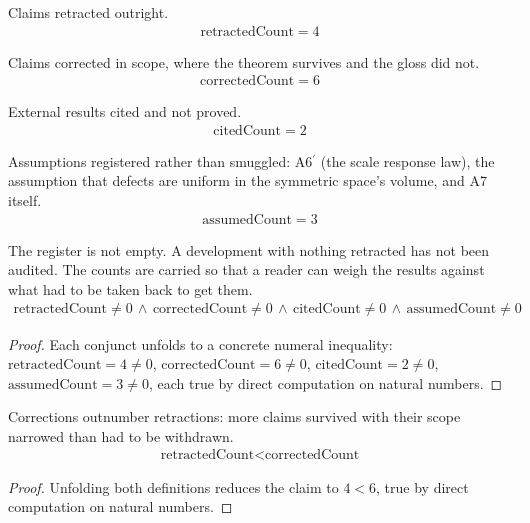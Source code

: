 \begin{definition}
Claims retracted outright.
\begin{align*}
\text{retractedCount} = 4
\end{align*}
\end{definition}

\begin{definition}
Claims corrected in scope, where the theorem survives and the gloss did not.
\begin{align*}
\text{correctedCount} = 6
\end{align*}
\end{definition}

\begin{definition}
External results cited and not proved.
\begin{align*}
\text{citedCount} = 2
\end{align*}
\end{definition}

\begin{definition}
Assumptions registered rather than smuggled: A6$^\prime$ (the scale response law), the assumption that defects are uniform in the symmetric space's volume, and A7 itself.
\begin{align*}
\text{assumedCount} = 3
\end{align*}
\end{definition}

\begin{theorem}
The register is not empty.  A development with nothing retracted has not been audited.  The counts are carried so that a reader can weigh the results against what had to be taken back to get them.
\begin{align*}
\text{retractedCount} \neq 0 \,\wedge\, \text{correctedCount} \neq 0 \,\wedge\, \text{citedCount} \neq 0 \,\wedge\, \text{assumedCount} \neq 0
\end{align*}
\begin{proof}
Each conjunct unfolds to a concrete numeral inequality: $\text{retractedCount}=4\neq0$, $\text{correctedCount}=6\neq0$, $\text{citedCount}=2\neq0$, $\text{assumedCount}=3\neq0$, each true by direct computation on natural numbers.
\end{proof}
\end{theorem}

\begin{theorem}
Corrections outnumber retractions: more claims survived with their scope narrowed than had to be withdrawn.
\begin{align*}
\text{retractedCount} < \text{correctedCount}
\end{align*}
\begin{proof}
Unfolding both definitions reduces the claim to $4<6$, true by direct computation on natural numbers.
\end{proof}
\end{theorem}

